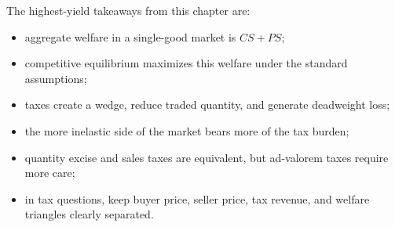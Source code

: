 \begin{examtip}
The highest-yield takeaways from this chapter are:
\begin{itemize}
    \item aggregate welfare in a single-good market is $CS+PS$;
    \item competitive equilibrium maximizes this welfare under the standard assumptions;
    \item taxes create a wedge, reduce traded quantity, and generate deadweight loss;
    \item the more inelastic side of the market bears more of the tax burden;
    \item quantity excise and sales taxes are equivalent, but ad-valorem taxes require more care;
    \item in tax questions, keep buyer price, seller price, tax revenue, and welfare triangles clearly separated.
\end{itemize}
\end{examtip}